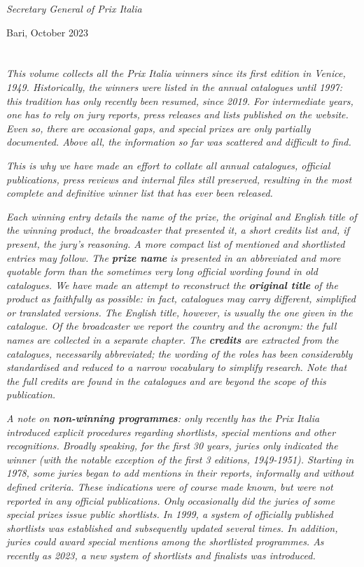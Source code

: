 {{\noindent\textit{Secretary General of Prix Italia}

\bigskip\par
\noindent Bari, October 2023\\
\pagebreak\\
\vspace{70pt}\\
\textsl{This volume collects all the Prix Italia winners since its first edition in Venice, 1949. Historically, the winners were listed in the annual catalogues until 1997: this tradition has only recently been resumed, since 2019. For intermediate years, one has to rely on jury reports, press releases and lists published on the website. Even so, there are occasional gaps, and special prizes are only partially documented. Above all, the information so far was scattered and difficult to find.}

\textsl{This is why we have made an effort to collate all annual catalogues, official publications, press reviews and internal files still preserved, resulting in the most complete and definitive winner list that has ever been released.}

\bigskip

\textsl{Each winning entry details the name of the prize, the original and English title of the winning product, the broadcaster that presented it, a short credits list and, if present, the jury's reasoning. A more compact list of mentioned and shortlisted entries may follow. The \textbf{prize name} is presented in an abbreviated and more quotable form than the sometimes very long official wording found in old catalogues. We have made an attempt to reconstruct the \textbf{original title} of the product as faithfully as possible: in fact, catalogues may carry different, simplified or translated versions. The English title, however, is usually the one given in the catalogue. Of the broadcaster we report the country and the acronym: the full names are collected in a separate chapter. The \textbf{credits} are extracted from the catalogues, necessarily abbreviated; the wording of the roles has been considerably standardised and reduced to a narrow vocabulary to simplify research. Note that the full credits are found in the catalogues and are beyond the scope of this publication.}

\bigskip

\noindent\textsl{A note on \textbf{non-winning programmes}: only recently has the Prix Italia introduced explicit procedures regarding shortlists, special mentions and other recognitions. Broadly speaking, for the first 30 years, juries only indicated the winner (with the notable exception of the first 3 editions, 1949-1951). Starting in 1978, some juries began to add mentions in their reports, informally and without defined criteria. These indications were of course made known, but were not reported in any official publications. Only occasionally did the juries of some special prizes issue public shortlists. In 1999, a system of officially published shortlists was established and subsequently updated several times. In addition, juries could award special mentions among the shortlisted programmes. As recently as 2023, a new system of shortlists and finalists was introduced.}

}}
